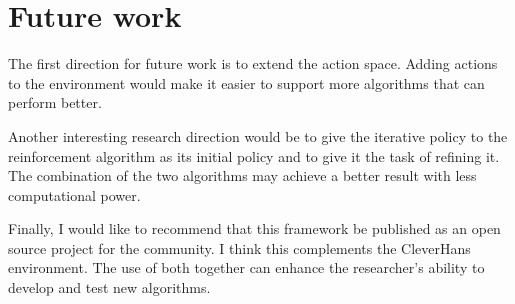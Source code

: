\documentclass{article}
\begin{document}
\section{Future work}
The first direction for future work is to extend the action space. Adding actions to the environment would make it easier to support more algorithms that can perform better.

Another interesting research direction would be to give the iterative policy to the reinforcement algorithm as its initial policy and to give it the task of refining it. The combination of the two algorithms may achieve a better result with less computational power.

Finally, I would like to recommend that this framework be published as an open source project for the community. I think this complements the CleverHans environment. The use of both together can enhance the researcher's ability to develop and test new algorithms.


  
 
\end{document}
